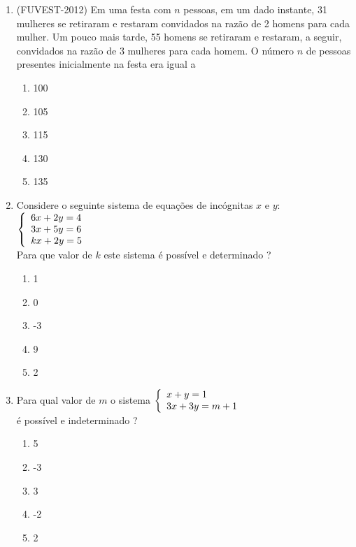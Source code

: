 \documentclass[a4paper,12pt]{article}
\begin{document}
\begin{enumerate}
    

    \item (FUVEST-2012) Em uma festa com $n$ pessoas, em um dado instante, 31 mulheres se retiraram e restaram convidados na razão de 2 homens para cada mulher. Um pouco mais tarde, 55 homens se retiraram e restaram, a seguir, convidados na razão de 3 mulheres para cada homem. O número $n$ de pessoas presentes inicialmente na festa era igual a
        \begin{enumerate}
		\item 100
		\item 105
		\item 115
        \item 130
		\item 135
		\end{enumerate}
    
    
    

    \item Considere o seguinte sistema de equações de incógnitas $x$ e $y$: \\
        $ 
\left\{
\begin{array}{ll}
\displaystyle 6x + 2y = 4 \\
\displaystyle 3x + 5y = 6\\
\displaystyle kx + 2y = 5\\
\end{array}
\right.\\
$
   \\        
   Para que valor de $k$ este sistema é possível e determinado ?
       \begin{enumerate}
    	\item 1
		\item 0
		\item -3
        \item 9
		\item 2
		\end{enumerate}



    \item Para qual valor de $m$  o sistema 
    $ 
\left\{
\begin{array}{ll}
\displaystyle x + y = 1 \\
\displaystyle 3x + 3y = m + 1\\
\end{array}
\right.\\
$
   \\
   é possível e indeterminado ?
    \begin{enumerate}
        \item 5
		\item -3
		\item 3
        \item -2
		\item 2
		\end{enumerate}



\end{enumerate}
\end{document}
